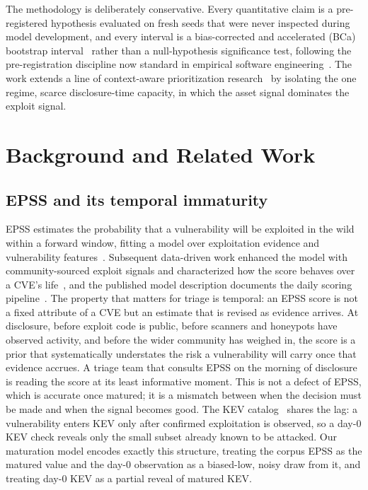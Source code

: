 \documentclass[journal]{IEEEtran}
\begin{document}
The methodology is deliberately conservative. Every quantitative claim is a pre-registered
hypothesis evaluated on fresh seeds that were never inspected during model development, and every
interval is a bias-corrected and accelerated (BCa) bootstrap
interval~\cite{efron1987bca,efron1994introduction} rather than a null-hypothesis significance test,
following the pre-registration discipline now standard in empirical software
engineering~\cite{wohlin2012experimentation}. The work extends a line of context-aware
prioritization research~\cite{paper1vulnprio,paper4hygieneprio} by isolating the one regime, scarce
disclosure-time capacity, in which the asset signal dominates the exploit signal.

\section{Background and Related Work}

\subsection{EPSS and its temporal immaturity}
EPSS estimates the probability that a vulnerability will be exploited in the wild within a forward
window, fitting a model over exploitation evidence and vulnerability features~\cite{jacobs2021epss}.
Subsequent data-driven work enhanced the model with community-sourced exploit signals and
characterized how the score behaves over a CVE's life~\cite{jacobs2023enhancing}, and the published
model description documents the daily scoring pipeline~\cite{firstepss}. The property that matters
for triage is temporal: an EPSS score is not a fixed attribute of a CVE but an estimate that is
revised as evidence arrives. At disclosure, before exploit code is public, before scanners and
honeypots have observed activity, and before the wider community has weighed in, the score is a
prior that systematically understates the risk a vulnerability will carry once that evidence
accrues. A triage team that consults EPSS on the morning of disclosure is reading the score at its
least informative moment. This is not a defect of EPSS, which is accurate once matured; it is a
mismatch between when the decision must be made and when the signal becomes good. The KEV
catalog~\cite{cisakev} shares the lag: a vulnerability enters KEV only after confirmed exploitation
is observed, so a day-0 KEV check reveals only the small subset already known to be attacked. Our
maturation model encodes exactly this structure, treating the corpus EPSS as the matured value and
the day-0 observation as a biased-low, noisy draw from it, and treating day-0 KEV as a partial
reveal of matured KEV.
\end{document}
